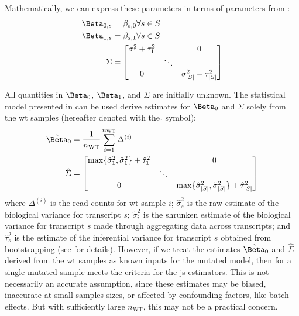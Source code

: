 Mathematically, we can express these parameters in terms of parameters from :
%
\begin{align*}
  \Beta_{0,s} & = \beta_{s,0} \forall s \in S \\
  \Beta_{1,s} & = \beta_{s,1} \forall s \in S \\
  \Sigma      & = \begin{bmatrix}
    \sigma_1^2 + \tau_1^2 &        & 0                             \\
                          & \ddots                                 \\
    0                     &        & \sigma_{|S|}^2 + \tau_{|S|}^2 \\
  \end{bmatrix}
\end{align*}

All quantities in $\Beta_0$, $\Beta_1$, and $\Sigma$ are initially unknown.
The statistical model presented in \cite[REF][]{pimentelDifferentialAnalysisRNAseq2017} can be used derive estimates for $\Beta_0$ and $\Sigma$ solely from the \gls{wt} samples (hereafter denoted with the $\hat{}$ symbol):
%
\begin{align*}
  \hat{\Beta}_0 & = \frac{1}{n_\mathrm{WT}} \sum_{i = 1}^{n_\mathrm{WT}} \Delta^{(i)} \\
  \hat{\Sigma}  & = \begin{bmatrix}
    \max\{\hat{\sigma}_1^2, \tilde{\sigma}_1^2\} + \hat{\tau}_1^2 &        & 0                                                                         \\
                                                                  & \ddots                                                                             \\
    0                                                             &        & \max\{\hat{\sigma}_{|S|}^2, \tilde{\sigma}_{|S|}^2\} + \hat{\tau}_{|S|}^2 \\
  \end{bmatrix}
\end{align*}
%
where $\Delta^{(i)}$ is the read counts for \gls{wt} sample $i$; $\hat{\sigma}_s^2$ is the raw estimate of the biological variance for transcript $s$; $\tilde{\sigma}_i^2$ is the shrunken estimate of the biological variance for transcript $s$ made through aggregating data across transcripts; and $\hat{\tau}_s^2$ is the estimate of the inferential variance for transcript $s$ obtained from bootstrapping (see \cite[REF][]{pimentelDifferentialAnalysisRNAseq2017} for details).
However, if we treat the estimates $\hat{\Beta}_0$ and $\hat{\Sigma}$ derived from the \gls{wt} samples as known inputs for the mutated model, then  for a single mutated sample meets the criteria for the \gls{js} estimators.
This is not necessarily an accurate assumption, since these estimates may be biased, inaccurate at small samples sizes, or affected by confounding factors, like batch effects.
But with sufficiently large $n_\mathrm{WT}$, this may not be a practical concern.

